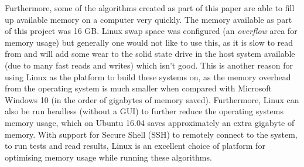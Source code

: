 Furthermore, some of the algorithms created as part of this paper are able to fill up available memory on a computer very quickly. The memory available as part of this project was 16 GB. Linux swap space was configured (an \textit{overflow} area for memory usage) but generally one would not like to use this, as it is slow to read from and will add some wear to the solid state drive in the host system available (due to many fast reads and writes) which isn't good. This is another reason for using Linux as the platform to build these systems on, as the memory overhead from the operating system is much smaller when compared with Microsoft Windows 10 (in the order of gigabytes of memory saved). Furthermore, Linux can also be run headless (without a GUI) to further reduce the operating systems memory usage, which on Ubuntu 16.04 saves approximately an extra gigabyte of memory. With support for Secure Shell (SSH) to remotely connect to the system, to run tests and read results, Linux is an excellent choice of platform for optimising memory usage while running these algorithms.

